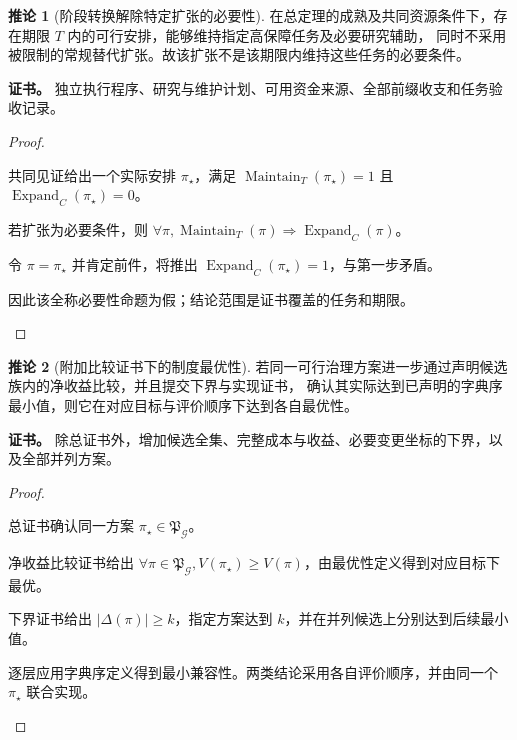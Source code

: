 \documentclass[UTF8,12pt,a4paper,openany,fontset=none,zihao=false]{ctexrep}
\theoremstyle{definition}
\newtheorem{corollary}{推论}[chapter]
\newenvironment{certificate}{\par\noindent\textbf{证书。}\ignorespaces}{\par}
\newcommand{\1}{\mathbf 1}
\begin{document}
\begin{corollary}[阶段转换解除特定扩张的必要性]
在总定理的成熟及共同资源条件下，存在期限 \(T\) 内的可行安排，能够维持指定高保障任务及必要研究辅助，
同时不采用被限制的常规替代扩张。故该扩张不是该期限内维持这些任务的必要条件。
\end{corollary}
\begin{certificate}
独立执行程序、研究与维护计划、可用资金来源、全部前缀收支和任务验收记录。
\end{certificate}
\begin{proof}
\begin{semanticsteps}
\item 共同见证给出一个实际安排 \(\pi_\star\)，满足
\(\operatorname{Maintain}_T(\pi_\star)=1\) 且 \(\operatorname{Expand}_C(\pi_\star)=0\)。
\item 若扩张为必要条件，则
\(\forall\pi,\operatorname{Maintain}_T(\pi)\Rightarrow\operatorname{Expand}_C(\pi)\)。
\item 令 \(\pi=\pi_\star\) 并肯定前件，将推出 \(\operatorname{Expand}_C(\pi_\star)=1\)，与第一步矛盾。
\item 因此该全称必要性命题为假；结论范围是证书覆盖的任务和期限。
\end{semanticsteps}
\end{proof}

\begin{corollary}[附加比较证书下的制度最优性]
若同一可行治理方案进一步通过声明候选族内的净收益比较，并且提交下界与实现证书，
确认其实际达到已声明的字典序最小值，则它在对应目标与评价顺序下达到各自最优性。
\end{corollary}
\begin{certificate}
除总证书外，增加候选全集、完整成本与收益、必要变更坐标的下界，以及全部并列方案。
\end{certificate}
\begin{proof}
\begin{semanticsteps}
\item 总证书确认同一方案 \(\pi_\star\in\mathfrak P_{\mathcal G}\)。
\item 净收益比较证书给出
\(\forall\pi\in\mathfrak P_{\mathcal G},V(\pi_\star)\ge V(\pi)\)，由最优性定义得到对应目标下最优。
\item 下界证书给出 \(\lvert\Delta(\pi)\rvert\ge k\)，指定方案达到 \(k\)，并在并列候选上分别达到后续最小值。
\item 逐层应用字典序定义得到最小兼容性。两类结论采用各自评价顺序，并由同一个 \(\pi_\star\) 联合实现。
\end{semanticsteps}
\end{proof}
\end{document}

